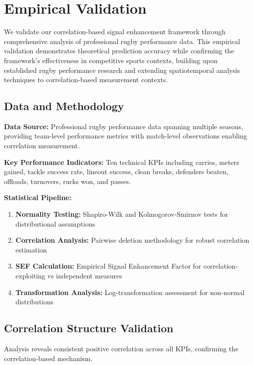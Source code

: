 \section{Empirical Validation}

We validate our correlation-based signal enhancement framework through comprehensive analysis of professional rugby performance data. This empirical validation demonstrates theoretical prediction accuracy while confirming the framework's effectiveness in competitive sports contexts, building upon established rugby performance research \cite{bennett2019descriptive, scott2023performance, bennett2021predicting} and extending spatiotemporal analysis techniques \cite{bornn2021spatiotemporal} to correlation-based measurement contexts.

\subsection{Data and Methodology}

\textbf{Data Source:} Professional rugby performance data spanning multiple seasons, providing team-level performance metrics with match-level observations enabling correlation measurement.

\textbf{Key Performance Indicators:} Ten technical KPIs including carries, meters gained, tackle success rate, lineout success, clean breaks, defenders beaten, offloads, turnovers, rucks won, and passes.

\textbf{Statistical Pipeline:}
\begin{enumerate}
    \item \textbf{Normality Testing:} Shapiro-Wilk and Kolmogorov-Smirnov tests for distributional assumptions
    \item \textbf{Correlation Analysis:} Pairwise deletion methodology for robust correlation estimation  
    \item \textbf{SEF Calculation:} Empirical Signal Enhancement Factor for correlation-exploiting vs independent measures
    \item \textbf{Transformation Analysis:} Log-transformation assessment for non-normal distributions
\end{enumerate}

\subsection{Correlation Structure Validation}

Analysis reveals consistent positive correlation across all KPIs, confirming the correlation-based mechanism.

